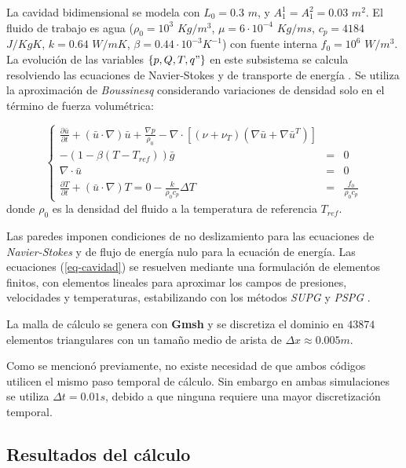 La cavidad bidimensional se modela con $L_0=0.3$ $m$, y $A_1^1=A_1^2=0.03$ $m^2$.
El fluido de trabajo es agua ($\rho_0=10^3$ $Kg/m^3$, $\mu=6\cdot 10^{-4}$ $Kg/ms$, $c_p=4184$ $J/KgK$, 
$k=0.64$ $W/mK$, $\beta=0.44\cdot10^{-3}K^{-1}$)
con fuente interna $f_0=10^6$ $W/m^3$.
La evolución de las variables $\{p,Q,T,q"\}$ en este subsistema se calcula resolviendo las ecuaciones de Navier-Stokes {\cite{gunzburger}}
y de transporte de energía \cite{kays}. 
Se utiliza la aproximación de \textit{Boussinesq} considerando variaciones de densidad solo en el término de fuerza volumétrica:

\begin{equation}
\left\{ \begin{array}{rcl}
\displaystyle \frac {\partial \bar{u}}{\partial t} + ( \bar{u} \cdot \nabla) \bar{u}  + \frac {\nabla p}{\rho_0} - 
\nabla \cdot \left[ \left( \nu + \nu_T \right) \left( \nabla \bar{u} + \nabla \bar{u}^T \right) \right] && \\
- \left( 1- \beta (T-T_{ref}) \right)\bar{g} &=& 0 \\ [0.2cm]
\nabla \cdot \bar{u} &=& 0 \\ [0.2cm]
\displaystyle \frac {\partial T}{\partial t} + ( \bar{u} \cdot \nabla) T =0 - \frac {k}{\rho_0 c_p} \Delta T &=& \displaystyle \frac{f_0}{\rho_0 c_p}
\label{eq-cavidad}
\end{array}
\right.
\end{equation}
donde $\rho_0$ es la densidad del fluido a la temperatura de referencia $T_{ref}$.

Las paredes imponen condiciones de no deslizamiento para las ecuaciones de \textit{Navier-Stokes} y de flujo de energía nulo para la ecuación de energía.
Las ecuaciones (\ref{eq-cavidad}) se resuelven mediante una formulación de elementos finitos, 
con elementos lineales para aproximar los campos de presiones, velocidades y temperaturas, 
estabilizando con los métodos \textit{SUPG} \cite{supg} y \textit{PSPG} \cite{pspg}.

La malla de cálculo se genera con \textbf{Gmsh} \cite{gmsh} y se discretiza el dominio en $43874$ elementos triangulares con un tamaño medio de arista de $\Delta x \approx 0.005m$. 

Como se mencionó previamente, no existe necesidad de que ambos códigos utilicen el mismo paso temporal de cálculo.
Sin embargo en ambas simulaciones se utiliza $\Delta t=0.01s$, debido a que ninguna requiere una mayor discretización temporal.

\subsection*{Resultados del cálculo}

